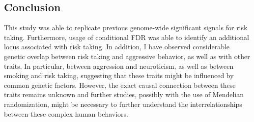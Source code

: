\subsection{Conclusion}
\label{sub:conclusion_assoc}

This study was able to replicate previous genome-wide significant signals for risk taking.
Furthermore, usage of conditional FDR was able to identify an additional locus associated with risk taking.
In addition, I have observed considerable genetic overlap between risk taking and aggressive behavior, as well as with other traits.
In particular, between aggression and neuroticism, as well as between smoking and risk taking, 
suggesting that these traits might be influenced by common genetic factors.
However, the exact causal connection between these traits remains unknown and further studies, possibly with the use of Mendelian randomization, might be necessary to further understand the interrelationships between these complex human behaviors. 
